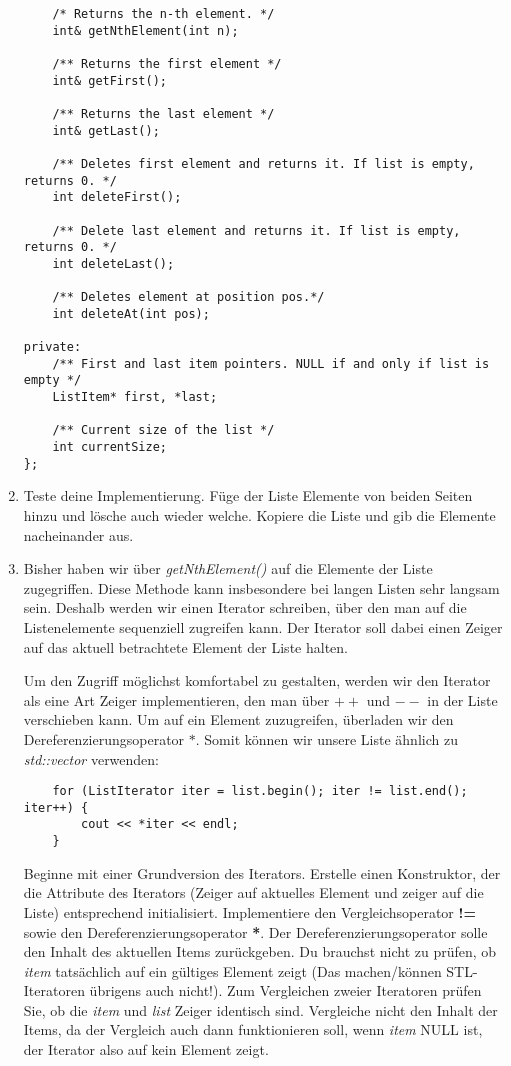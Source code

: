 \documentclass[
  accentcolor=tud1c,	%
  colorbacktitle,		%
  inverttitle,			%
  german,				%
  twoside
]{tudexercise}
\begin{document}
\begin{enumerate}
\begin{lstlisting}
	/* Returns the n-th element. */
	int& getNthElement(int n);

	/** Returns the first element */
	int& getFirst();

	/** Returns the last element */
	int& getLast();

	/** Deletes first element and returns it. If list is empty, returns 0. */
	int deleteFirst();

	/** Delete last element and returns it. If list is empty, returns 0. */
	int deleteLast();
	
	/** Deletes element at position pos.*/
	int deleteAt(int pos);

private:
	/** First and last item pointers. NULL if and only if list is empty */
	ListItem* first, *last;
	
	/** Current size of the list */
	int currentSize;
};
\end{lstlisting}

\item
Teste deine Implementierung.
Füge der Liste Elemente von beiden Seiten hinzu und lösche auch wieder welche.
Kopiere die Liste und gib die Elemente nacheinander aus.

\item 
Bisher haben wir über \emph{getNthElement()} auf die Elemente der Liste zugegriffen.
Diese Methode kann insbesondere bei langen Listen sehr langsam sein.
Deshalb werden wir einen Iterator schreiben, über den man auf die Listenelemente sequenziell zugreifen kann.
Der Iterator soll dabei einen Zeiger auf das aktuell betrachtete Element der Liste halten.

Um den Zugriff möglichst komfortabel zu gestalten, werden wir den Iterator als eine Art Zeiger implementieren, den man über \textbf{$++$} und \textbf{$--$} in der Liste verschieben kann.
Um auf ein Element zuzugreifen, überladen wir den Dereferenzierungsoperator $*$.
Somit können wir unsere Liste ähnlich zu \emph{std::vector} verwenden:
\begin{lstlisting}
	for (ListIterator iter = list.begin(); iter != list.end(); iter++) {
		cout << *iter << endl;
	}
\end{lstlisting}

Beginne mit einer Grundversion des Iterators.
Erstelle einen Konstruktor, der die Attribute des Iterators (Zeiger auf aktuelles Element und zeiger auf die Liste) entsprechend initialisiert.
Implementiere den Vergleichsoperator \textbf{!=} sowie den Dereferenzierungsoperator \textbf{*}.
Der Dereferenzierungsoperator solle den Inhalt des aktuellen Items zurückgeben.
Du brauchst nicht zu prüfen, ob \emph{item} tatsächlich auf ein gültiges Element zeigt (Das machen/können STL-Iteratoren übrigens auch nicht!).
Zum Vergleichen zweier Iteratoren prüfen Sie, ob die \emph{item} und \emph{list} Zeiger identisch sind.
Vergleiche nicht den Inhalt der Items, da der Vergleich auch dann funktionieren soll, wenn \emph{item} NULL ist, der Iterator also auf kein Element zeigt.  \\


\end{enumerate}
\end{document}
